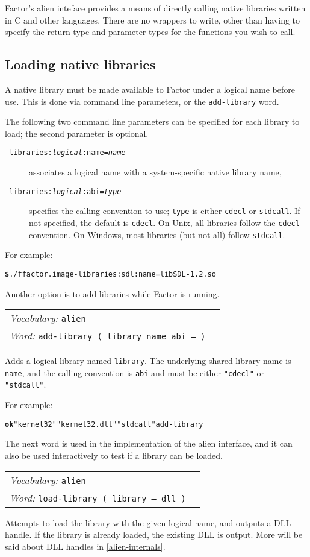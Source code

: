 \documentclass{book}
\newcommand{\vocabulary}[1]{\emph{Vocabulary:} \texttt{#1}&\\}
\newcommand{\ordinaryword}[2]{\index{\texttt{#1}}\emph{Word:} \texttt{#2}&\\}
\newcommand{\wordtable}[1]{

\begin{tabularx}{12cm}[t]{lX}
\hline
#1
\hline
\end{tabularx}

}
\begin{document}
Factor's alien inteface provides a means of directly calling native libraries written in C and other languages. There are no
wrappers to write, other than having to specify the return type and parameter types for
the functions you wish to call.

\subsection{Loading native libraries}

A native library must be made available to Factor under a logical name before use. This is done via command line parameters, or the \verb|add-library| word.

The following two command line parameters can be specified for each library to load; the second parameter is optional.
\begin{description}
\item[\texttt{-libraries:\emph{logical}:name=\emph{name}}] associates a logical name with a system-specific native library name,
\item[\texttt{-libraries:\emph{logical}:abi=\emph{type}}] specifies the calling convention to use; \verb|type| is either \verb|cdecl| or \verb|stdcall|. If not specified, the default is \verb|cdecl|. On Unix, all libraries follow the \verb|cdecl| convention. On Windows, most libraries (but not all) follow \verb|stdcall|.
\end{description}

For example:
\begin{alltt}
\textbf{\$} ./f factor.image -libraries:sdl:name=libSDL-1.2.so
\end{alltt}

Another option is to add libraries while Factor is running.
\wordtable{
\vocabulary{alien}
\ordinaryword{add-library}{add-library ( library name abi -- )}
}
Adds a logical library named \verb|library|. The underlying shared library name is \verb|name|, and the calling convention is \verb|abi| and must be either \verb|"cdecl"| or \verb|"stdcall"|.

For example:
\begin{alltt}
\textbf{ok} "kernel32" "kernel32.dll"  "stdcall"  add-library
\end{alltt}
The next word is used in the implementation of the alien interface, and it can also be used
interactively to test if a library can be loaded.

\wordtable{
\vocabulary{alien}
\ordinaryword{load-library}{load-library ( library -- dll )}
}
Attempts to load the library with the given logical name, and outputs a DLL handle. If the library is already loaded, the existing DLL is output.
More will be said about DLL handles in \ref{alien-internals}.
\end{document}
